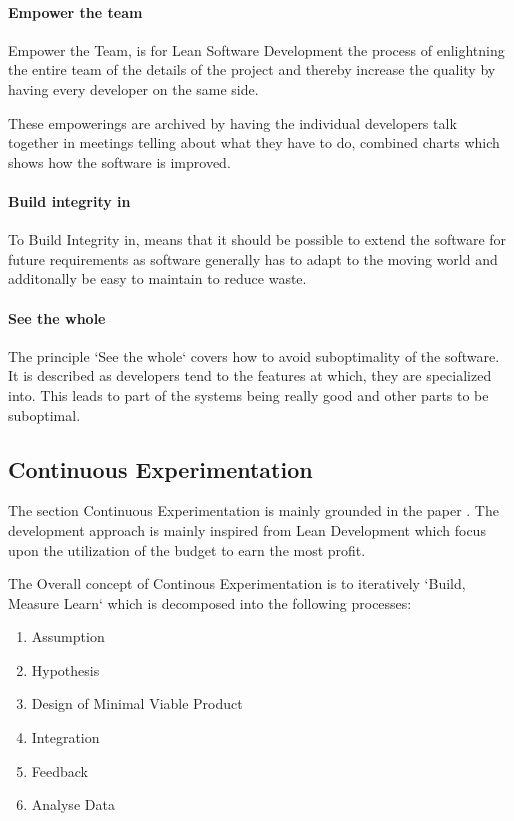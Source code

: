 \documentclass{sig-alternate}
\begin{document}
\paragraph{Empower the team}
Empower the Team, is for Lean Software Development the process of enlightning the entire team of the 
details of the project and thereby increase the quality by having every developer on the same side. 

These empowerings are archived by having the individual developers talk together in meetings telling
about what they have to do, combined charts which shows how the software is improved.

\paragraph{Build integrity in}
To Build Integrity in, means that it should be possible to extend the software for future requirements 
as software generally has to adapt to the moving world and additonally be easy to maintain to reduce waste.

\paragraph{See the whole}
The principle `See the whole` covers how to avoid suboptimality of the software. 
It is described as developers tend to the features at which, they are specialized into.
This leads to part of the systems being really good and other parts to be suboptimal.

\subsection{Continuous Experimentation}
The section Continuous Experimentation is mainly grounded in the paper \cite{bowman:reasoning}.
The development approach is mainly inspired from Lean Development which focus upon the utilization of the budget to earn the most profit.

The Overall concept of Continous Experimentation is to iteratively `Build, Measure Learn` which is
decomposed into the following processes: 
\begin{enumerate}
\item Assumption
\item Hypothesis
\item Design of Minimal Viable Product
\item Integration
\item Feedback
\item Analyse Data
\end{enumerate}
\end{document}
